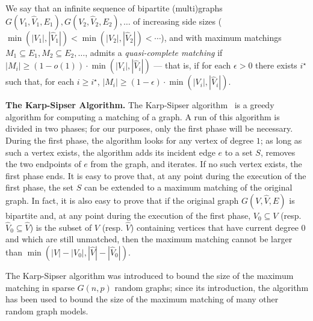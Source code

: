 \documentclass[11pt]{article}
\begin{document}
\smallskip

We  say that an infinite sequence of bipartite (multi)graphs $G(V_1,\hat{V}_1,E_1), G(V_2,\hat{V}_2,E_2), \ldots$ of increasing side sizes ($\min(|V_1|,|\hat{V}_1|) < \min(|V_2|,|\hat{V}_2|) < \cdots$), and with maximum matchings $M_1 \subseteq E_1, M_2 \subseteq E_2,\ldots$,   admits a {\em quasi-complete matching} if $|M_i| \ge (1-o(1)) \cdot \min(|V_i|, |\hat{V}_i|)$ --- that is, if for each $\epsilon > 0$ there exists $i^{\star}$ such that, for each $i \ge i^{\star}$, $|M_i| \ge (1-\epsilon) \cdot \min(|V_i|, |\hat{V}_i|)$.

\smallskip

{\bf The Karp-Sipser Algorithm.}
The Karp-Sipser algorithm~\cite{ks81} is a greedy algorithm for computing a matching of a graph. A run of this algorithm is  divided in two phases; for our purposes, only the first phase will be necessary. During the first phase, the algorithm looks for any vertex of degree $1$; as long as such a vertex exists, the algorithm adds its incident edge $e$ to a set $S$,  removes the two endpoints of $e$ from the graph, and iterates. If no such vertex exists, the first phase ends. It is easy to prove that, at any point during the execution of the first phase, the set $S$ can be extended to a maximum matching of the original graph. In fact, it is also easy to prove that if the original graph $G(V,\hat{V},E)$ is bipartite and, at any point during the execution of the first phase, $V_0 \subseteq V$ (resp. $\hat{V}_0\subseteq \hat{V}$) is  the subset of $V$ (resp. $\hat{V}$) containing  vertices that  have current degree $0$ and which are still unmatched, then the maximum matching cannot be larger than $\min\left(|V| - |V_0|, |\hat{V}| - |\hat{V}_0|\right)$.

\smallskip

The Karp-Sipser algorithm was introduced to bound the size of the maximum matching in sparse $G(n,p)$ random graphs; since its introduction, the algorithm has been used
to bound the size of the maximum matching of many other random graph models.

\smallskip
\end{document}
